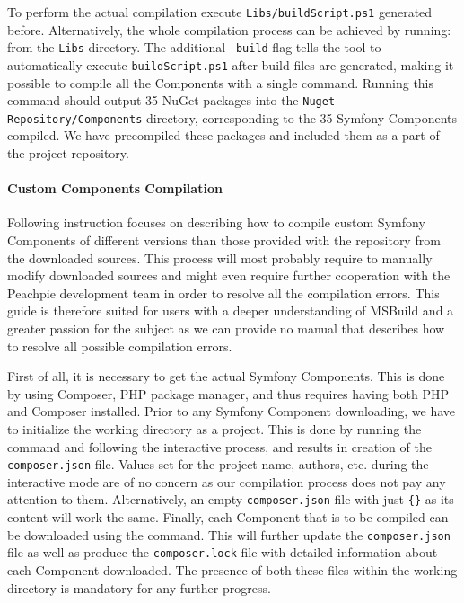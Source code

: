 To perform the actual compilation execute \texttt{Libs/buildScript.ps1} generated before. Alternatively, the whole compilation process can be achieved by running: \noindent{} from the \texttt{Libs} directory. The additional \texttt{--build} flag tells the tool to automatically execute \texttt{buildScript.ps1} after build files are generated, making it possible to compile all the Components with a single command. Running this command should output 35 NuGet packages into the \texttt{Nuget-Repository/Components} directory, corresponding to the 35 Symfony Components compiled. We have precompiled these packages and included them as a part of the project repository. 

\paragraph{Custom Components Compilation}
Following instruction focuses on describing how to compile custom Symfony Components of different versions than those provided with the repository from the downloaded sources. This process will most probably require to manually modify downloaded sources and might even require further cooperation with the Peachpie development team in order to resolve all the compilation errors. This guide is therefore suited for users with a deeper understanding of MSBuild and a greater passion for the subject as we can provide no manual that describes how to resolve all possible compilation errors. 

First of all, it is necessary to get the actual Symfony Components. This is done by using Composer, PHP package manager, and thus requires having both PHP and Composer installed. Prior to any Symfony Component downloading, we have to initialize the working directory as a project. This is done by running the \noindent{} command and following the interactive process, and results in creation of the \texttt{composer.json} file. Values set for the project name, authors, etc. during the interactive mode are of no concern as our compilation process does not pay any attention to them. Alternatively, an empty \texttt{composer.json} file with just \texttt{\{\}} as its content will work the same. Finally, each Component that is to be compiled can be downloaded using the \noindent{} command. This will further update the \texttt{composer.json} file as well as produce the \texttt{composer.lock} file with detailed information about each Component downloaded. The presence of both these files within the working directory is mandatory for any further progress.

